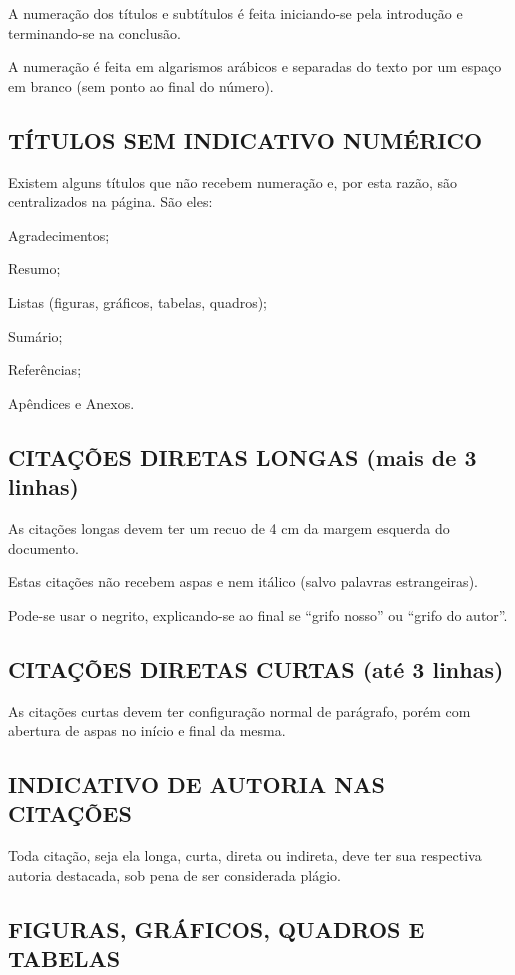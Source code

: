 A numeração dos títulos e subtítulos é feita iniciando-se pela introdução e terminando-se na conclusão. 

A numeração é feita em algarismos arábicos e separadas do texto por um espaço em branco (sem ponto ao final do número).

\subsection{TÍTULOS SEM INDICATIVO NUMÉRICO}

Existem alguns títulos que não recebem numeração e, por esta razão, são centralizados na página. São eles:


Agradecimentos;

Resumo;

Listas (figuras, gráficos, tabelas, quadros);

Sumário;

Referências;

Apêndices e Anexos.

\subsection{CITAÇÕES DIRETAS LONGAS (mais de 3 linhas)}

As citações longas devem ter um recuo de 4 cm da margem esquerda do documento.

Estas citações não recebem aspas e nem itálico (salvo palavras estrangeiras).

Pode-se usar o negrito, explicando-se ao final se “grifo nosso” ou “grifo do autor”.

\subsection{CITAÇÕES DIRETAS CURTAS (até 3 linhas)}

As citações curtas devem ter configuração normal de parágrafo, porém com abertura de aspas no início e final da mesma.

\subsection{INDICATIVO DE AUTORIA NAS CITAÇÕES}

Toda citação, seja ela longa, curta, direta ou indireta, deve ter sua respectiva autoria destacada, sob pena de ser considerada plágio. 

\subsection{FIGURAS, GRÁFICOS, QUADROS E TABELAS}

